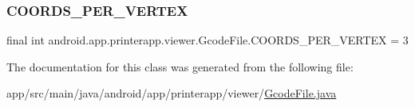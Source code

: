 \subsubsection{\texorpdfstring{C\+O\+O\+R\+D\+S\+\_\+\+P\+E\+R\+\_\+\+V\+E\+R\+T\+EX}{COORDS\_PER\_VERTEX}}
{\footnotesize\ttfamily final int android.\+app.\+printerapp.\+viewer.\+Gcode\+File.\+C\+O\+O\+R\+D\+S\+\_\+\+P\+E\+R\+\_\+\+V\+E\+R\+T\+EX = 3\hspace{0.3cm}{\ttfamily [static]}}



The documentation for this class was generated from the following file\+:\begin{DoxyCompactItemize}
\item 
app/src/main/java/android/app/printerapp/viewer/\hyperlink{_gcode_file_8java}{Gcode\+File.\+java}\end{DoxyCompactItemize}
